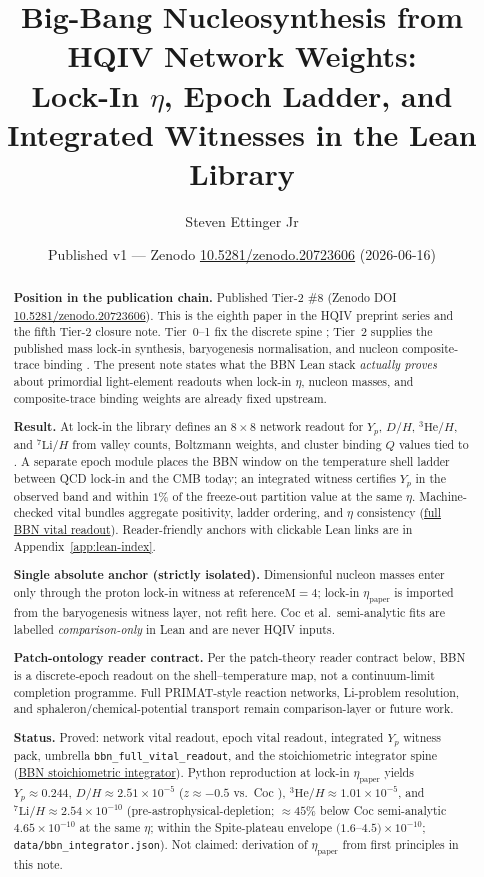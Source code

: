 \documentclass[11pt]{amsart}
\title[BBN light elements from network weights]{Big-Bang Nucleosynthesis from HQIV Network Weights:\\
Lock-In $\eta$, Epoch Ladder, and Integrated Witnesses in the Lean Library}
\author{Steven Ettinger Jr}
\date{Published v1 --- Zenodo \href{https://doi.org/10.5281/zenodo.20723606}{10.5281/zenodo.20723606} (2026-06-16)}
\newcommand{\etap}{\ensuremath{\eta_{\mathrm{paper}}}}
\begin{document}
\begin{abstract}
\noindent\textbf{Position in the publication chain.}
Published Tier-2 \#8 (Zenodo
DOI \href{https://doi.org/10.5281/zenodo.20723606}{10.5281/zenodo.20723606}).
This is the eighth paper in the HQIV preprint series and the
fifth Tier-2 closure note. Tier~0--1 fix the discrete spine
\cite{ettinger2026hqiv,hqiv-lightcone-paper,hqiv-so8-paper,hqiv-3d-growth-paper,hqiv-oct-action-paper,hqiv-kirchhoff-paper,hqiv-thermo-arrow-paper};
Tier~2 supplies the published mass lock-in synthesis, baryogenesis normalisation, and nucleon
composite-trace binding \cite{hqiv-tuft-sm-lagrangian-paper,hqiv-baryogenesis-paper,hqiv-nucleon-binding-paper}.
The present note states what the BBN Lean stack \emph{actually proves} about
primordial light-element readouts when lock-in $\eta$, nucleon masses, and
composite-trace binding weights are already fixed upstream.

\noindent\textbf{Result.}
At lock-in the library defines an $8\times8$ network readout for
$Y_p$, $D/H$, $^3\mathrm{He}/H$, and $^7\mathrm{Li}/H$ from valley
counts, Boltzmann weights, and cluster binding $Q$ values tied to
\cite{hqiv-tuft-sm-lagrangian-paper}. A separate epoch module places the BBN
window on the temperature shell ladder between QCD lock-in and the CMB
today; an integrated witness certifies $Y_p$ in the observed band and
within $1\%$ of the freeze-out partition value at the same $\eta$.
Machine-checked vital bundles aggregate positivity, ladder ordering, and
$\eta$ consistency (\hyperref[lean:bbn-full-vital]{full BBN vital readout}).
Reader-friendly anchors with clickable Lean links are in
Appendix~\ref{app:lean-index}.

\noindent\textbf{Single absolute anchor (strictly isolated).}
Dimensionful nucleon masses enter only through the proton lock-in witness
at $\mathrm{referenceM}=4$; lock-in \etap{} is imported from the baryogenesis
witness layer, not refit here. Coc et al.\ semi-analytic
fits \cite{coc2015} are labelled \emph{comparison-only} in Lean and are
never HQIV inputs.

\noindent\textbf{Patch-ontology reader contract.}
Per the patch-theory reader contract below, BBN is a discrete-epoch
readout on the shell--temperature map, not a continuum-limit completion
programme. Full PRIMAT-style reaction networks, Li-problem resolution, and
sphaleron/chemical-potential transport remain comparison-layer or future
work.

\noindent\textbf{Status.}
Proved: network vital readout, epoch vital readout, integrated $Y_p$
witness pack, umbrella \texttt{bbn\_full\_vital\_readout}, and the
stoichiometric integrator spine (\hyperref[lean:bbn-stoichiometric]{BBN
stoichiometric integrator}). Python reproduction at lock-in
$\eta_{\mathrm{paper}}$ yields $Y_p\approx 0.244$, $D/H\approx
2.51\times 10^{-5}$ ($z\approx -0.5$ vs.\ Coc \cite{coc2015}), $^3\mathrm{He}/H\approx
1.01\times 10^{-5}$, and $^7\mathrm{Li}/H\approx 2.54\times 10^{-10}$
(pre-astrophysical-depletion; $\approx 45\%$ below Coc semi-analytic
$4.65\times 10^{-10}$ at the same $\eta$; within the Spite-plateau envelope
$(1.6$--$4.5)\times 10^{-10}$; \texttt{data/bbn\_integrator.json}). Not claimed: derivation of
\etap{} from first principles in this note.
\end{abstract}
\end{document}
